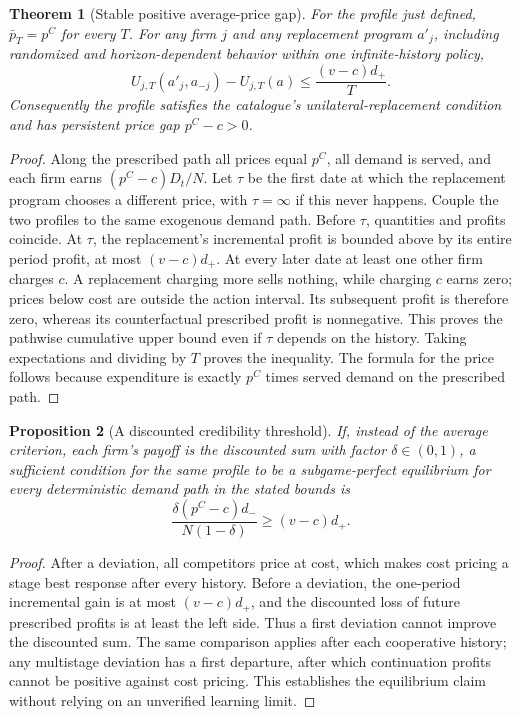 \documentclass[11pt]{article}
\newtheorem{theorem}{Theorem}
\newtheorem{proposition}[theorem]{Proposition}
\theoremstyle{definition}
\theoremstyle{remark}
\begin{document}
\begin{theorem}[Stable positive average-price gap]
For the profile just defined, $\bar p_T=p^C$ for every $T$. For any firm $j$ and any replacement program $a'_j$, including randomized and horizon-dependent behavior within one infinite-history policy,
\[
 U_{j,T}(a'_j,a_{-j})-U_{j,T}(a)
 \le \frac{(v-c)d_+}{T}.
\]
Consequently the profile satisfies the catalogue's unilateral-replacement condition and has persistent price gap $p^C-c>0$.
\end{theorem}
\begin{proof}
Along the prescribed path all prices equal $p^C$, all demand is served, and each firm earns $(p^C-c)D_t/N$. Let $\tau$ be the first date at which the replacement program chooses a different price, with $\tau=\infty$ if this never happens. Couple the two profiles to the same exogenous demand path. Before $\tau$, quantities and profits coincide. At $\tau$, the replacement's incremental profit is bounded above by its entire period profit, at most $(v-c)d_+$. At every later date at least one other firm charges $c$. A replacement charging more sells nothing, while charging $c$ earns zero; prices below cost are outside the action interval. Its subsequent profit is therefore zero, whereas its counterfactual prescribed profit is nonnegative. This proves the pathwise cumulative upper bound even if $\tau$ depends on the history. Taking expectations and dividing by $T$ proves the inequality. The formula for the price follows because expenditure is exactly $p^C$ times served demand on the prescribed path.
\end{proof}

\begin{proposition}[A discounted credibility threshold]
If, instead of the average criterion, each firm's payoff is the discounted sum with factor $\delta\in(0,1)$, a sufficient condition for the same profile to be a subgame-perfect equilibrium for every deterministic demand path in the stated bounds is
\[
 \frac{\delta (p^C-c)d_-}{N(1-\delta)}\ge (v-c)d_+.
\]
\end{proposition}
\begin{proof}
After a deviation, all competitors price at cost, which makes cost pricing a stage best response after every history. Before a deviation, the one-period incremental gain is at most $(v-c)d_+$, and the discounted loss of future prescribed profits is at least the left side. Thus a first deviation cannot improve the discounted sum. The same comparison applies after each cooperative history; any multistage deviation has a first departure, after which continuation profits cannot be positive against cost pricing. This establishes the equilibrium claim without relying on an unverified learning limit.
\end{proof}
\end{document}
